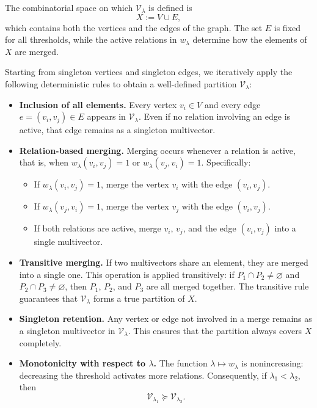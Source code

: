 \documentclass{article}
\theoremstyle{definition}
\theoremstyle{plain}
\theoremstyle{remark}
\newcommand{\1}{\mathbbm{1}}  %
\begin{document}
\medskip
The combinatorial space on which $\mathcal V_\lambda$ is defined is
\[
X := V \cup E,
\]
which contains both the vertices and the edges of the graph.
The set $E$ is fixed for all thresholds, while the active relations in
$w_\lambda$ determine how the elements of $X$ are merged.

\medskip
Starting from singleton vertices and singleton edges, we iteratively apply the
following deterministic rules to obtain a well-defined partition
$\mathcal V_\lambda$:

\begin{itemize}
    \item \textbf{Inclusion of all elements.}
    Every vertex $v_i\in V$ and every edge $e=(v_i,v_j)\in E$
    appears in $\mathcal V_\lambda$.  
    Even if no relation involving an edge is active, that edge remains as a
    singleton multivector.

    \item \textbf{Relation-based merging.}
    Merging occurs whenever a relation is active, that is, when
    $w_\lambda(v_i,v_j)=1$ or $w_\lambda(v_j,v_i)=1$.  Specifically:
    \begin{itemize}
        \item If $w_\lambda(v_i,v_j)=1$, merge the vertex $v_i$ with the edge
              $(v_i,v_j)$.
        \item If $w_\lambda(v_j,v_i)=1$, merge the vertex $v_j$ with the edge
              $(v_i,v_j)$.
        \item If both relations are active, merge $v_i$, $v_j$, and the edge
              $(v_i,v_j)$ into a single multivector.
    \end{itemize}


    \item \textbf{Transitive merging.}
    If two multivectors share an element, they are merged into a single one.
    This operation is applied transitively: if
    $P_1\cap P_2\neq\varnothing$ and $P_2\cap P_3\neq\varnothing$,
    then $P_1$, $P_2$, and $P_3$ are all merged together.
    The transitive rule guarantees that $\mathcal V_\lambda$ forms a true
    partition of $X$.

    \item \textbf{Singleton retention.}
    Any vertex or edge not involved in a merge remains as a singleton
    multivector in $\mathcal V_\lambda$.
    This ensures that the partition always covers $X$ completely.

    \item \textbf{Monotonicity with respect to $\lambda$.}
    The function $\lambda \mapsto w_\lambda$ is nonincreasing:
    decreasing the threshold activates more relations.
    Consequently, if $\lambda_1<\lambda_2$, then
    \[
        \mathcal V_{\lambda_1} \succeq \mathcal V_{\lambda_2}.
    \] 


\end{itemize}
\end{document}
